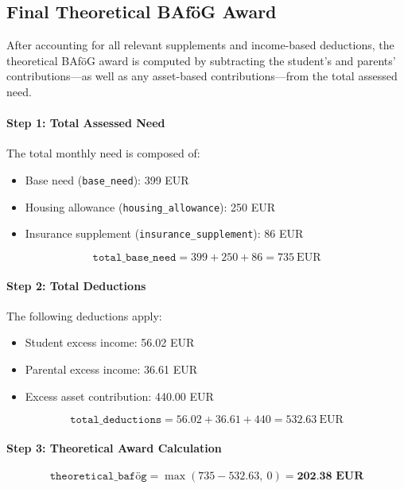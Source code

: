 \subsection{Final Theoretical BAföG Award}

After accounting for all relevant supplements and income-based deductions, the theoretical BAföG award is computed by subtracting the student’s and parents’ contributions—as well as any asset-based contributions—from the total assessed need.

\paragraph{Step 1: Total Assessed Need}

The total monthly need is composed of:
\begin{itemize}
    \item Base need (\texttt{base\_need}): 399 EUR
    \item Housing allowance (\texttt{housing\_allowance}): 250 EUR
    \item Insurance supplement (\texttt{insurance\_supplement}): 86 EUR
\end{itemize}

\[
\texttt{total\_base\_need} = 399 + 250 + 86 = 735~\text{EUR}
\]

\paragraph{Step 2: Total Deductions}

The following deductions apply:
\begin{itemize}
    \item Student excess income: 56.02 EUR
    \item Parental excess income: 36.61 EUR
    \item Excess asset contribution: 440.00 EUR
\end{itemize}

\[
\texttt{total\_deductions} = 56.02 + 36.61 + 440 = 532.63~\text{EUR}
\]

\paragraph{Step 3: Theoretical Award Calculation}

\[
\texttt{theoretical\_bafög} = \max(735 - 532.63,\ 0) = \textbf{202.38~EUR}
\]


